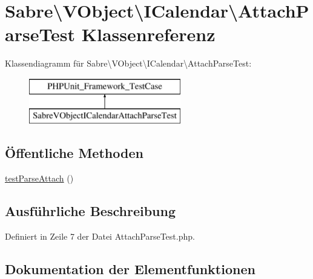 \hypertarget{class_sabre_1_1_v_object_1_1_i_calendar_1_1_attach_parse_test}{}\section{Sabre\textbackslash{}V\+Object\textbackslash{}I\+Calendar\textbackslash{}Attach\+Parse\+Test Klassenreferenz}
\label{class_sabre_1_1_v_object_1_1_i_calendar_1_1_attach_parse_test}
Klassendiagramm für Sabre\textbackslash{}V\+Object\textbackslash{}I\+Calendar\textbackslash{}Attach\+Parse\+Test\+:\begin{figure}[H]
\begin{center}
\leavevmode
\includegraphics[height=2.000000cm]{class_sabre_1_1_v_object_1_1_i_calendar_1_1_attach_parse_test}
\end{center}
\end{figure}
\subsection*{Öffentliche Methoden}
\begin{DoxyCompactItemize}
\item 
\mbox{\hyperlink{class_sabre_1_1_v_object_1_1_i_calendar_1_1_attach_parse_test_ab7ad290fad30c25593badc2f0a465b2a}{test\+Parse\+Attach}} ()
\end{DoxyCompactItemize}


\subsection{Ausführliche Beschreibung}


Definiert in Zeile 7 der Datei Attach\+Parse\+Test.\+php.



\subsection{Dokumentation der Elementfunktionen}
\mbox{\label{class_sabre_1_1_v_object_1_1_i_calendar_1_1_attach_parse_test_ab7ad290fad30c25593badc2f0a465b2a}} 

